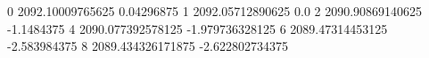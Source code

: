 0 2092.10009765625 0.04296875
1 2092.05712890625 0.0
2 2090.90869140625 -1.1484375
4 2090.077392578125 -1.979736328125
6 2089.47314453125 -2.583984375
8 2089.434326171875 -2.622802734375
